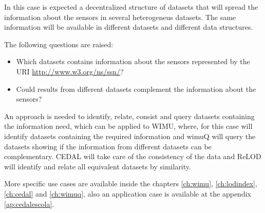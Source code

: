 In this case is expected a decentralized structure of datasets that will spread the information about the sensors in several heterogeneus datasets. The same information will be available in different datasets and different data structures.

The following questions are raised:
\begin{itemize}
    \item Which datasets contains information about the sensors represented by the URI \url{http://www.w3.org/ns/ssn/}?
    \item Could results from different datasets complement the information about the sensors?
\end{itemize}

An approach is needed to identify, relate, consist and query datasets containing the information need, which can be applied to WIMU\cite{valdestilhas2018my}, where, for this case will identify datasets containing the required information and wimuQ\cite{ValdestilhasKcap} will query the datasets showing if the information from different datasets can be complementary. CEDAL\cite{valdestilhas2017cedal} will take care of the consistency of the data and ReLOD\cite{valdestilhasSWJ2020} will identify and relate all equivalent datasets by similarity.


More specific use cases are available inside the chapters \ref{ch:wimu}, \ref{ch:lodindex}, \ref{ch:cedal} and \ref{ch:wimuq}, also an application case is available at the appendix \ref{ap:cedalescola}.